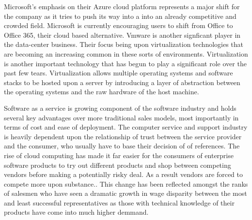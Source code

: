 Microsoft's emphasis on their Azure cloud platform represents a major shift for the company as it tries to push its way into a into an already competitive and crowded field.\autocite[]{OptimismInnovation}
Microsoft is currently encouraging users to shift from Office  to Office 365, their cloud based alternative.\autocite[]{NextGenBusinessSoftware}
Vmware is another signficant player in the data-center business. Their focus being upon virtualization technologies that are becoming an increasing common in these sorts of environments.\autocite[]{NextGenBusinessSoftware}
Virtualization is another important technology that has begun to play a significant role over the past few tears.\autocite[]{LargeParadigmShiftCloudComputing}
Virtualization allows multiple operating systems and software stacks to be hosted upon a server by introducing a layer of abstraction between the operating systems and the raw hardware of the host machine.\autocite[]{LargeParadigmShiftCloudComputing}

Software as a service is growing component of the software industry and holds several key advantages over more traditional sales models, most importantly in terms of cost and ease of deployment.\autocite[]{GrowthTrendsSoftwareService}\autocite[]{TransitionPhaseEnterpriseApplication}
The computer service and support industry is heavily dependent upon the relationship of trust between the service provider and the consumer, who usually have to base their decision of of references.\autocite[9]{buxmann2012software}
The rise of cloud computing has made it far easier for the consumers of enterprise software products to try out different products and shop between competing vendors before making a potentially risky deal.\autocite[29]{LiquidLunch}
As a result vendors are forced to compete more upon substance.\autocite[29]{LiquidLunch}. This change has been reflected amongst the ranks of salesmen who have seen a dramatic growth in wage disparity between the most and least successful representatives as those with technical knowledge of their products have come into much higher demmand.\autocite[30]{LiquidLunch}


